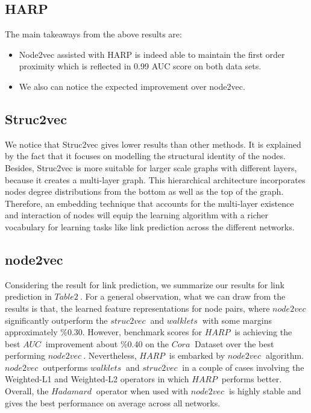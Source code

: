 \documentclass[a4paper,13pt]{article}
\begin{document}
\subsection{\textbf{HARP}}
The main takeaways from the above results are:
\begin{itemize}
    \item Node2vec assisted with HARP is indeed able to maintain the first order proximity which is reflected in 0.99 AUC score on both data sets.
    \item We also can notice the expected improvement over node2vec.
\end{itemize}
\subsection{\textbf{Struc2vec}}
We notice that Struc2vec gives lower results than other methods. It is explained by the fact that it focuses on modelling the structural identity of the nodes. Besides, Struc2vec is more suitable for larger scale graphs with different layers, because it creates a multi-layer graph. This hierarchical architecture incorporates nodes degree distributions from the bottom as well as the top of the graph. Therefore, an embedding technique that accounts for the multi-layer existence and interaction of nodes will equip the learning algorithm with a richer vocabulary for learning tasks like link prediction across the different networks.

\subsection{\textbf{node2vec}}
Considering the result for link prediction, we summarize our results for link prediction in $ Table 2 \ $.  For a general observation, what we can draw from the results is that, the learned feature
representations for node pairs, where $ node2vec \ $ significantly outperform the $ struc2vec \ $ and $ walklets \ $ with some margins approximately \%0.30.
However, benchmark scores for $ HARP \ $ is achieving the best $ AUC \ $ improvement about \%0.40 on the $ Cora \ $  Dataset over the best performing $ node2vec \ $. Nevertheless, $ HARP \ $ is embarked by $ node2vec \ $ algorithm.
$ node2vec \ $ outperforms $ walklets \ $ and $ struc2vec \ $ in a couple of cases involving the Weighted-L1 and Weighted-L2 operators in which $ HARP \ $ performs better. Overall, the $ Hadamard \ $ operator when used with $ node2vec \ $ is highly stable and gives the best performance on average across all networks.
\end{document}
